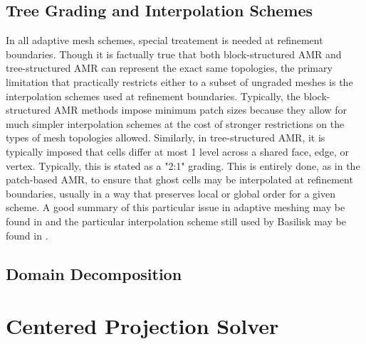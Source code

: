 \subsection{Tree Grading and Interpolation Schemes}

In all adaptive mesh schemes, special treatement is needed at refinement
boundaries. Though it is factually true that both block-structured AMR and
tree-structured AMR can represent the exact same topologies, the primary
limitation that practically restricts either to a subset of ungraded meshes is
the interpolation schemes used at refinement boundaries. Typically, the
block-structured AMR methods impose minimum patch sizes because they allow for
much simpler interpolation schemes at the cost of stronger restrictions on the
types of mesh topologies allowed. Similarly, in tree-structured AMR, it is
typically imposed that cells differ at most 1 level across a shared face, edge,
or vertex. Typically, this is stated as a "2:1" grading. This is entirely done,
as in the patch-based AMR, to ensure that ghost cells may be interpolated at
refinement boundaries, usually in a way that preserves local or global order
for a given scheme. A good summary of this particular issue in adaptive meshing
may be found in \textcite{batty_cell-centred_2017} and the particular
interpolation scheme still used by Basilisk may be found in
\textcite{popinet_gerris_2003}.

\subsection{Domain Decomposition}

\section{Centered Projection Solver}
\label{sec:centered-projection-solver}

